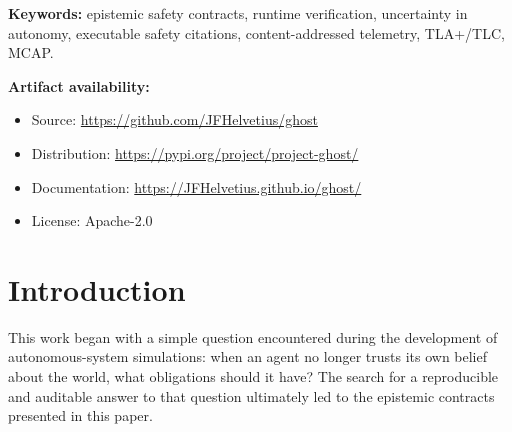 \documentclass[11pt,a4paper]{article}
\begin{document}
\begin{abstract}
\noindent\textbf{Results.} Empirical evaluation on a violation
matrix of six injected bug categories, three structurally
distinct calibration policies, three shape-realistic drift
profiles, a head-to-head benchmark against RTAMT, and a
\textbf{three-ULog discrimination experiment} on real PX4 SITL
flight telemetry establishes that the verifier is
policy-agnostic, deterministic across Linux and Windows CI
runners, and informative on real-world telemetry. With
independent simulator GT auto-detected (ADR-0037, v0.2.5), the
$3 \times 6 = 18$ discrimination matrix is $18/18$ green;
$15/18$ cells isolate the violation to the expected property
(the single non-isolated row is a documented true co-violation
between BAUD-v1 and MD-v1).

\noindent\textbf{Conclusions.} Epistemic safety contracts
constitute a tractable property class for autonomous agents.
The framework supports incremental contract addition (one
\texttt{register\_contract(...)} call), keeps verifiers
backward-compatible, and produces mechanical evidence that
withstands third-party audit. The full artifact is re-runnable
from a fresh clone (see [AUDIT.md, REPRODUCE.md, INSTALL.md]).
\end{abstract}

\medskip
\noindent\textbf{Keywords:} epistemic safety contracts, runtime
verification, uncertainty in autonomy, executable safety citations,
content-addressed telemetry, TLA+/TLC, MCAP.

\medskip
\noindent\textbf{Artifact availability:}
\begin{itemize}[noitemsep,topsep=0pt]
  \item Source: \url{https://github.com/JFHelvetius/ghost}
  \item Distribution: \url{https://pypi.org/project/project-ghost/}
  \item Documentation: \url{https://JFHelvetius.github.io/ghost/}
  \item License: Apache-2.0
\end{itemize}

\section{Introduction}
\label{sec:intro}

This work began with a simple question encountered during the
development of autonomous-system simulations: when an agent no
longer trusts its own belief about the world, what obligations
should it have? The search for a reproducible and auditable
answer to that question ultimately led to the epistemic contracts
presented in this paper.
\end{document}
